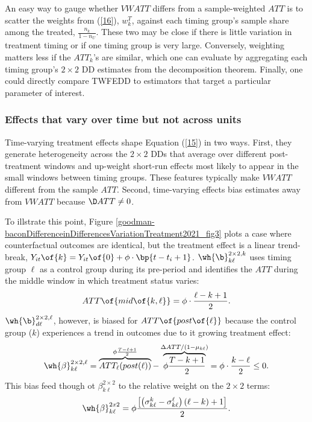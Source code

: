 \documentclass[12pt]{article}
\theoremstyle{definition}
\begin{document}
An easy way to gauge whether $VWATT$ differs from a sample-weighted $ATT$ is to scatter the weights from (\ref{16}), $w_k^T$, against each timing group's sample share among the treated, $\frac{n_k}{1-n_U}$. These two may be close if there is little variation in  treatment timing or if one timing group is very large. Conversely, weighting matters less if the $ATT_k$'s are similar, which one can evaluate by aggregating each timing group's $2\times2$ DD estimates from the decomposition theorem. Finally, one could directly compare TWFEDD to estimators that target a particular parameter of interest.

\subsubsection{Effects that vary over time but not across units}

Time-varying treatment effects shape Equation (\ref{15}) in two ways. First, they generate heterogeneity across the $2\times 2$ DDs that average over different post-treatment windows and up-weight short-run effects most likely to appear in the small windows between timing groups. These features typically make $VWATT$ different from the sample $ATT$. Second, time-varying effects bias estimates away from $VWATT$ because $\D ATT \neq 0$. 

To illstrate this point, Figure \ref{goodman-baconDifferenceinDifferencesVariationTreatment2021_fig3} plots a case where counterfactual outcomes are identical, but the treatment effect is a linear trend-break, $Y_{it}\of{k} = Y_{it}\of{0} + \phi \cdot \bp{t - t_i + 1}$. $\wh{\b}_{k\ell}^{2\times2, k}$ uses timing group $\ell$ as a control group during its pre-period and identifies the $ATT$ during the middle window in which treatment status varies: 
$$
ATT\of{mid\of{k, \ell}} = \phi \cdot \frac{\ell - k + 1}{2}.
$$
$\wh{\b}_{d\ell}^{2\times2, \ell}$, however, is biased for $ATT\of{post\of{\ell}}$ because the control group ($k$) experiences a trend in outcomes due to it growing treatment effect:
\begin{equation}
    \label{17}
    \wh{\beta}_{k \ell}^{2 \times 2, \ell}=\overbrace{{A T T_{\ell}({post}(\ell))}}^{\phi \frac{T-\ell+1}{2}}-\overbrace{\phi \frac{T-k+1}{2}}^{\Delta A T T /\left(1-\mu_{k \ell}\right)}=\phi \cdot \frac{k-\ell}{2} \leq 0 .
\end{equation}
This bias feed though ot $\beta_{k\ell}^{2\times2}$ to the relative weight on the $2\times 2$ terms:
\begin{equation}
    \label{18}
    \wh{\beta}_{k \ell}^{2 x 2}=\phi \frac{\left[\left(\sigma_{k \ell}^k-\sigma_{k \ell}^{\ell}\right)(\ell-k)+1\right]}{2} .
\end{equation}
\end{document}
